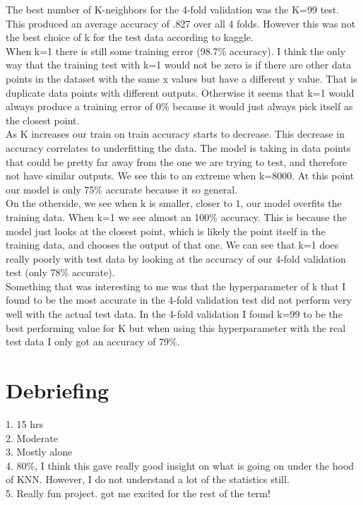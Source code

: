 \documentclass{article}
\begin{document}
The best number of K-neighbors for the 4-fold validation was the K=99 test. This produced an average accuracy of .827 over all 4 folds. However this was not the best choice of k for the test data according to kaggle. \\  
When k=1 there is still some training error (98.7\% accuracy). I think the only way that the training test with k=1 would not be zero is if there are other data points in the dataset with the same x values but have a different y value. That is duplicate data points with different outputs. Otherwise it seems that k=1 would always produce a training error of 0\% because it would just always pick itself as the closest point. \\
As K increases our train on train accuracy starts to decrease. This decrease in accuracy correlates to underfitting the data. The model is taking in data points that could be pretty far away from the one we are trying to test, and therefore not have similar outputs. We see this to an extreme when k=8000. At this point our model is only 75\% accurate because it so general. \\
On the otherside, we see when k is smaller, closer to 1, our model overfits the training data. When k=1 we see almost an 100\% accuracy. This is because the model just looks at the closest point, which is likely the point itself in the training data, and chooses the output of that one. We can see that k=1 does really poorly with test data by looking at the accuracy of our 4-fold validation test (only 78\% accurate). \\
Something that was interesting to me was that the hyperparameter of k that I found to be the most accurate in the 4-fold validation test did not perform very well with the actual test data. In the 4-fold validation I found k=99 to be the best performing value for K but when using this hyperparameter with the real test data I only got an accuracy of 79\%.


\section{Debriefing}
1. 15 hrs \\
2. Moderate \\
3. Mostly alone \\
4. 80\%, I think this gave really good insight on what is going on under the hood of KNN. However, I do not understand a lot of the statistics still. \\
5. Really fun project. got me excited for the rest of the term! \\
\end{document}
